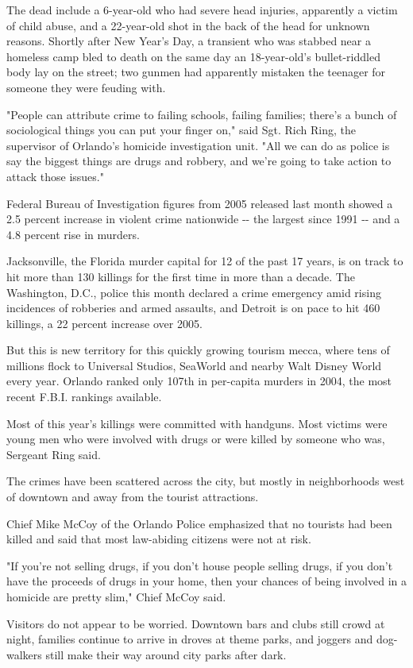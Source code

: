 The dead include a 6-year-old who had severe head injuries, apparently a
victim of child abuse, and a 22-year-old shot in the back of the head
for unknown reasons. Shortly after New Year's Day, a transient who was
stabbed near a homeless camp bled to death on the same day an
18-year-old's bullet-riddled body lay on the street; two gunmen had
apparently mistaken the teenager for someone they were feuding with.

"People can attribute crime to failing schools, failing families;
there's a bunch of sociological things you can put your finger on," said
Sgt. Rich Ring, the supervisor of Orlando's homicide investigation unit.
"All we can do as police is say the biggest things are drugs and
robbery, and we're going to take action to attack those issues."

Federal Bureau of Investigation figures from 2005 released last month
showed a 2.5 percent increase in violent crime nationwide -\/- the
largest since 1991 -\/- and a 4.8 percent rise in murders.

Jacksonville, the Florida murder capital for 12 of the past 17 years, is
on track to hit more than 130 killings for the first time in more than a
decade. The Washington, D.C., police this month declared a crime
emergency amid rising incidences of robberies and armed assaults, and
Detroit is on pace to hit 460 killings, a 22 percent increase over 2005.

But this is new territory for this quickly growing tourism mecca, where
tens of millions flock to Universal Studios, SeaWorld and nearby Walt
Disney World every year. Orlando ranked only 107th in per-capita murders
in 2004, the most recent F.B.I. rankings available.

Most of this year's killings were committed with handguns. Most victims
were young men who were involved with drugs or were killed by someone
who was, Sergeant Ring said.

The crimes have been scattered across the city, but mostly in
neighborhoods west of downtown and away from the tourist attractions.

Chief Mike McCoy of the Orlando Police emphasized that no tourists had
been killed and said that most law-abiding citizens were not at risk.

"If you're not selling drugs, if you don't house people selling drugs,
if you don't have the proceeds of drugs in your home, then your chances
of being involved in a homicide are pretty slim," Chief McCoy said.

Visitors do not appear to be worried. Downtown bars and clubs still
crowd at night, families continue to arrive in droves at theme parks,
and joggers and dog-walkers still make their way around city parks after
dark.

